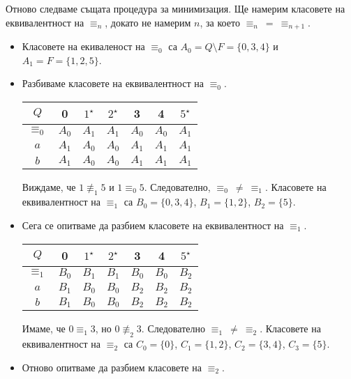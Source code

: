 \begin{example}
  
  Отново следваме същата процедура за минимизация.
  Ще намерим класовете на еквивалентност на $\equiv_n$,
  докато не намерим $n$, за което $\equiv_n\ =\ \equiv_{n+1}$.
  \begin{itemize}
  \item
    Класовете на екиваленост на $\equiv_0$ са 
    $A_0 = Q\setminus F = \{0,3,4\}$ и $A_1 = F = \{1,2,5\}$.
  \item
    Разбиваме класовете на еквивалентност на $\equiv_0$.
    
    \begin{tabular}{|c|c|c|c|c|c|c|}
      \hline
      $Q$ & 0 & $1^\star$ & $2^\star$ & 3 & 4 & $5^\star$ \\
      \hline
      \hline
      $\equiv_0$ & $A_0$ & $A_1$ & $A_1$ & $A_0$ & $A_0$ & $A_1$\\
      \hline
      $a$ & $A_1$& $A_0$ & $A_0$ & $A_1$ & $A_1$ & $A_1$\\
      \hline
      $b$ & $A_1$& $A_0$ & $A_0$ & $A_1$ & $A_1$ & $A_1$\\
      \hline
    \end{tabular}
    
    Виждаме, че $1 \not\equiv_1 5$ и $1 \equiv_0 5$.
    Следователно, $\equiv_0\ \neq\ \equiv_1$.
    Класовете на еквивалентност на $\equiv_1$ са 
    $B_0 = \{0,3,4\}$, $B_1 = \{1,2\}$, $B_2 = \{5\}$.
  \item
    Сега се опитваме да разбием класовете на еквивалентност на $\equiv_1$.

    \begin{tabular}{|c|c|c|c|c|c|c|}
      \hline
      $Q$ & 0 & $1^\star$ & $2^\star$ & 3 & 4 & $5^\star$ \\
      \hline
      \hline
      $\equiv_1$ & $B_0$ & $B_1$ & $B_1$ & $B_0$ & $B_0$ & $B_2$\\
      \hline
      $a$ & $B_1$ & $B_0$ & $B_0$ & $B_2$ & $B_2$ & $B_2$\\
      \hline
      $b$ & $B_1$ & $B_0$ & $B_0$ & $B_2$ & $B_2$ & $B_2$\\
      \hline
    \end{tabular}
    
    Имаме, че $0 \equiv_1 3$, но $0 \not\equiv_2 3$. Следователно $\equiv_1\ \neq\ \equiv_2$.
    Класовете на еквивалентност на $\equiv_2$ са 
    $C_0 = \{0\}$, $C_1 = \{1,2\}$, $C_2 = \{3,4\}$, $C_3 = \{5\}$.
  \item
    Отново опитваме да разбием класовете на $\equiv_2$.


\end{itemize}
\end{example}
